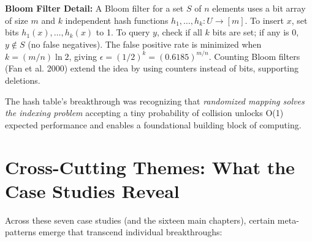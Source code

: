 \textbf{Bloom Filter Detail:} A Bloom filter for a set $S$ of $n$ elements uses a bit array of size $m$ and $k$ independent hash functions $h_1,\dots,h_k : U \to [m]$. To insert $x$, set bits $h_1(x),\dots,h_k(x)$ to 1. To query $y$, check if all $k$ bits are set; if any is 0, $y \notin S$ (no false negatives). The false positive rate is minimized when $k = (m/n)\ln 2$, giving $\epsilon = (1/2)^k = (0.6185)^{m/n}$. Counting Bloom filters (Fan et al. 2000) extend the idea by using counters instead of bits, supporting deletions.

The hash table's breakthrough was recognizing that \emph{randomized mapping solves the indexing problem} accepting a tiny probability of collision unlocks O(1) expected performance and enables a foundational building block of computing.

\section{Cross-Cutting Themes: What the Case Studies Reveal}
\label{sec:anatomy:cross_cutting}

Across these seven case studies (and the sixteen main chapters), certain meta-patterns emerge that transcend individual breakthroughs:

